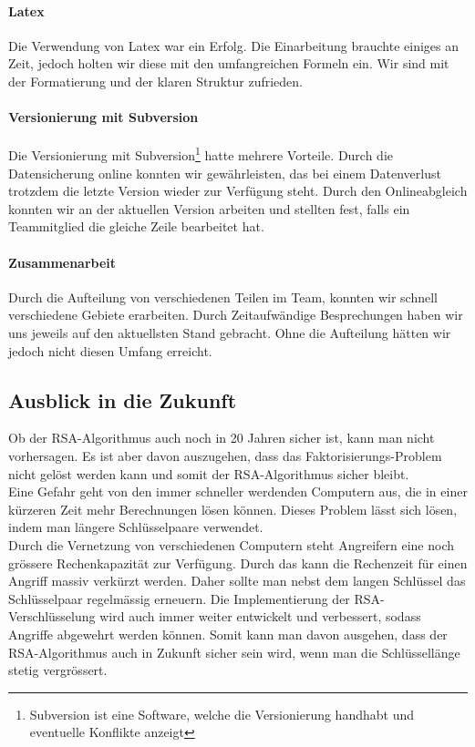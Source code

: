 \paragraph*{Latex}
Die Verwendung von Latex war ein Erfolg. Die Einarbeitung brauchte einiges an Zeit, jedoch holten wir diese mit den umfangreichen Formeln ein. Wir sind mit der Formatierung und der klaren Struktur zufrieden.
\paragraph*{Versionierung mit Subversion}
Die Versionierung mit Subversion\footnote{Subversion ist eine Software, welche die Versionierung handhabt und eventuelle Konflikte anzeigt} hatte mehrere Vorteile. Durch die Datensicherung online konnten wir gewährleisten, das bei einem Datenverlust trotzdem die letzte Version wieder zur Verfügung steht. Durch den Onlineabgleich konnten wir an der aktuellen Version arbeiten und stellten fest, falls ein Teammitglied die gleiche Zeile bearbeitet hat. 
\paragraph*{Zusammenarbeit}
Durch die Aufteilung von verschiedenen Teilen im Team, konnten wir schnell verschiedene Gebiete erarbeiten. Durch Zeitaufwändige Besprechungen haben wir uns jeweils auf den aktuellsten Stand gebracht. Ohne die Aufteilung hätten wir jedoch nicht diesen Umfang erreicht.
%
\subsection{Ausblick in die Zukunft}
Ob der RSA-Algorithmus auch noch in 20 Jahren sicher ist, kann man nicht vorhersagen. Es ist aber davon auszugehen, dass das Faktorisierungs-Problem nicht gelöst werden kann und somit der RSA-Algorithmus sicher bleibt.\\
Eine Gefahr geht von den immer schneller werdenden Computern aus, die in einer kürzeren Zeit mehr Berechnungen lösen können. Dieses Problem lässt sich lösen, indem man längere Schlüsselpaare verwendet.\\
Durch die Vernetzung von verschiedenen Computern steht Angreifern eine noch grössere Rechenkapazität zur Verfügung. Durch das kann die Rechenzeit für einen Angriff massiv verkürzt werden. Daher sollte man nebst dem langen Schlüssel das Schlüsselpaar regelmässig erneuern.
%
Die Implementierung der RSA-Verschlüsselung wird auch immer weiter entwickelt und verbessert, sodass Angriffe abgewehrt werden können.
Somit kann man davon ausgehen, dass der RSA-Algorithmus auch in Zukunft sicher sein wird, wenn man die Schlüssellänge stetig vergrössert.
%
\\[2ex]
